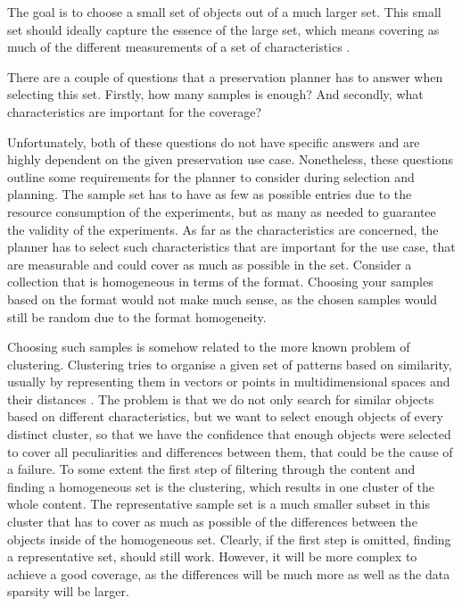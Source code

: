 The goal is to choose a small set of objects out of a much larger set.
This small set should ideally capture the essence of the large set, which means covering as much of the different measurements of a set of characteristics \cite{Becker:2011:PDT:1998076.1998089}.

There are a couple of questions that a preservation planner has to answer when selecting this set.
Firstly, how many samples is enough?
And secondly, what characteristics are important for the coverage?

Unfortunately, both of these questions do not have specific answers and are highly dependent on the given preservation use case.
Nonetheless, these questions outline some requirements for the planner to consider during selection and planning.
The sample set has to have as few as possible entries due to the resource consumption of the experiments, but as many as needed to guarantee the validity of the experiments.
As far as the characteristics are concerned, the planner has to select such characteristics that are important for the use case, that are measurable and could cover as much as possible in the set.
Consider a collection that is homogeneous in terms of the format.
Choosing your samples based on the format would not make much sense, as the chosen samples would still be random due to the format homogeneity.

Choosing such samples is somehow related to the more known problem of clustering.
Clustering tries to organise a given set of patterns based on similarity, usually by representing them in vectors or points in multidimensional spaces and their distances \cite{Jain:1999:DCR:331499.331504}.
The problem is that we do not only search for similar objects based on different characteristics, but we want to select enough objects of every distinct cluster, so that we have the confidence that enough objects were selected to cover all peculiarities and differences between them, that could be the cause of a failure.
To some extent the first step of filtering through the content and finding a homogeneous set is the clustering, which results   in one cluster of the whole content. The representative sample set is a much smaller subset in this cluster that has to cover as much as possible of the differences between the objects inside of the homogeneous set. Clearly, if the first step is omitted, finding a representative set, should still work. However, it will be more complex to achieve a good coverage, as the differences will be much more as well as the data sparsity will be larger. 